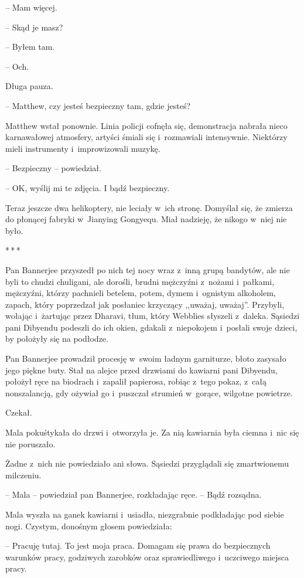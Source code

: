 \documentclass[oneside,polish,11pt,rmheadings]{mwbk}
\newcommand{\threeast}{\par\centerline{*\,*\,*}\medskip\par}
\begin{document}
-- Mam więcej. 

-- Skąd je masz?

-- Byłem tam. 

-- Och.

Długa pauza.

-- Matthew, czy jesteś bezpieczny tam, gdzie jesteś?

Matthew wstał ponownie. Linia policji cofnęła się, demonstracja nabrała nieco karnawałowej atmosfery, artyści śmiali się i~rozmawiali intensywnie. Niektórzy mieli instrumenty i~improwizowali muzykę.

-- Bezpieczny -- powiedział.

-- OK, wyślij mi te zdjęcia. I bądź bezpieczny. 

Teraz jeszcze dwa helikoptery, nie leciały w~ich stronę. Domyślał się, że zmierza do płonącej fabryki w~Jianying Gongyequ. Miał nadzieję, że nikogo w~niej nie było.

\bigskip
\threeast

Pan Bannerjee przyszedł po nich tej nocy wraz z~inną grupą bandytów, ale nie byli to chudzi chuligani, ale dorośli, brudni mężczyźni z~nożami i~pałkami, mężczyźni, którzy pachnieli betelem, potem, dymem i~ognistym alkoholem, zapach, który poprzedzał jak posłaniec krzyczący ,,uważaj, uważaj''. Przybyli, wołając i~żartując przez Dharavi, tłum, który Webblies słyszeli z~daleka. Sąsiedzi pani Dibyendu podeszli do ich okien, gdakali z~niepokojem i~posłali swoje dzieci, by położyły się na podłodze.

Pan Bannerjee prowadził procesję w~swoim ładnym garniturze, błoto zasysało jego piękne buty. Stał na alejce przed drzwiami do kawiarni pani Dibyendu, położył ręce na biodrach i~zapalił papierosa, robiąc z~tego pokaz, z~całą nonszalancją, gdy ożywiał go i~puszczał strumień w~gorące, wilgotne powietrze.

Czekał.

Mala pokuśtykała do drzwi i~otworzyła je. Za nią kawiarnia była ciemna i~nic się nie poruszało.

Żadne z~nich nie powiedziało ani słowa. Sąsiedzi przyglądali się zmartwionemu milczeniu.

-- Mala -- powiedział pan Bannerjee, rozkładając ręce. -- Bądź rozsądna.

Mala wyszła na ganek kawiarni i~usiadła, niezgrabnie podkładając pod siebie nogi. Czystym, donośnym głosem powiedziała: 

-- Pracuję tutaj. To jest moja praca. Domagam się prawa do bezpiecznych warunków pracy, godziwych zarobków oraz sprawiedliwego i~uczciwego miejsca pracy.
\end{document}
